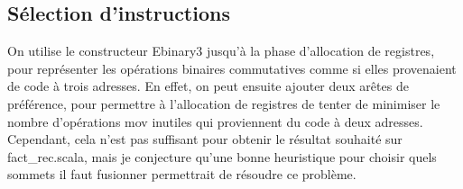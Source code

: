 \documentclass[a4paper,10pt]{article}
\newcommand{\code}[1]{{\fontfamily{pcr}\selectfont #1}}
\begin{document}
\subsection{Sélection d'instructions}
On utilise le constructeur \code{Ebinary3} jusqu'à la phase
d'allocation de registres, pour représenter les opérations binaires
commutatives comme si elles provenaient de code à trois adresses. En
effet, on peut ensuite ajouter deux arêtes de préférence, pour
permettre à l'allocation de registres de tenter de minimiser le nombre
d'opérations \code{mov} inutiles qui proviennent du code à deux
adresses. Cependant, cela n'est pas suffisant pour obtenir le résultat
souhaité sur \code{fact\_{}rec.scala}, mais je conjecture qu'une bonne
heuristique pour choisir quels sommets il faut fusionner permettrait
de résoudre ce problème.
\end{document}
